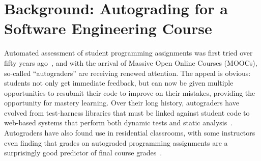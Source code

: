 \section{Background: Autograding for a Software Engineering Course}

Automated assessment of student programming assignments was first tried
over fifty years ago~\cite{hollingsworth60}, and with the arrival of
Massive Open Online Courses (MOOCs), so-called ``autograders'' are
receiving renewed attention.  The appeal is obvious: students not only
get immediate feedback, but can now be given multiple opportunities to
resubmit their code to improve on their mistakes, providing the
opportunity for mastery learning.  Over their long history, autograders
have evolved from test-harness libraries that must be linked against
student code to web-based systems that perform both dynamic tests and static
analysis~\cite{douce-2005-autograding-survey}.  Autograders have also
found use in residential classrooms, with some instructors even finding
that grades on autograded programming assignments are a surprisingly good
predictor of final course grades~\cite{navrat2014}.

